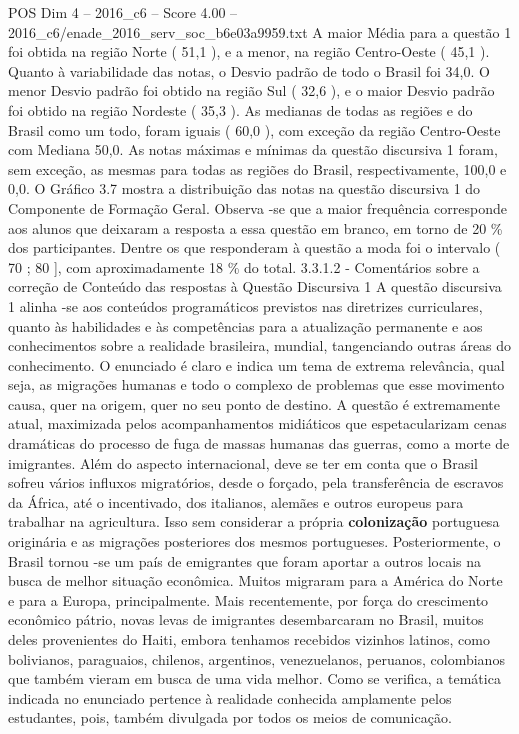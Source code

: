\begin{textsample}{POS Dim 4 – 2016\_c6 – Score 4.00 – 2016\_c6/enade\_2016\_serv\_soc\_b6e03a9959.txt}
A maior Média para a questão 1 foi obtida na região Norte ( 51,1 ), e a menor, na região Centro-Oeste ( 45,1 ).
Quanto à variabilidade das notas, o Desvio padrão de todo o Brasil foi 34,0.
O menor Desvio padrão foi obtido na região Sul ( 32,6 ), e o maior Desvio padrão foi obtido na região Nordeste ( 35,3 ).
As medianas de todas as regiões e do Brasil como um todo, foram iguais ( 60,0 ), com exceção da região Centro-Oeste com Mediana 50,0.
As notas máximas e mínimas da questão discursiva 1 foram, sem exceção, as mesmas para todas as regiões do Brasil, respectivamente, 100,0 e 0,0.
O Gráfico 3.7 mostra a distribuição das notas na questão discursiva 1 do Componente de Formação Geral.
Observa -se que a maior frequência corresponde aos alunos que deixaram a resposta a essa questão em branco, em torno de 20 \% dos participantes.
Dentre os que responderam à questão a moda foi o intervalo ( 70 ; 80 ], com aproximadamente 18 \% do total. 3.3.1.2 - Comentários sobre a correção de Conteúdo das respostas à Questão Discursiva 1 A questão discursiva 1 alinha -se aos conteúdos programáticos previstos nas diretrizes curriculares, quanto às habilidades e às competências para a atualização permanente e aos conhecimentos sobre a realidade brasileira, mundial, tangenciando outras áreas do conhecimento.
O enunciado é claro e indica um tema de extrema relevância, qual seja, as migrações humanas e todo o complexo de problemas que esse movimento causa, quer na origem, quer no seu ponto de destino.
A questão é extremamente atual, maximizada pelos acompanhamentos midiáticos que espetacularizam cenas dramáticas do processo de fuga de massas humanas das guerras, como a morte de imigrantes.
Além do aspecto internacional, deve se ter em conta que o Brasil sofreu vários influxos migratórios, desde o forçado, pela transferência de escravos da África, até o incentivado, dos italianos, alemães e outros europeus para trabalhar na agricultura.
Isso sem considerar a própria \textbf{colonização} portuguesa originária e as migrações posteriores dos mesmos portugueses.
Posteriormente, o Brasil tornou -se um país de emigrantes que foram aportar a outros locais na busca de melhor situação econômica.
Muitos migraram para a América do Norte e para a Europa, principalmente.
Mais recentemente, por força do crescimento econômico pátrio, novas levas de imigrantes desembarcaram no Brasil, muitos deles provenientes do Haiti, embora tenhamos recebidos vizinhos latinos, como bolivianos, paraguaios, chilenos, argentinos, venezuelanos, peruanos, colombianos que também vieram em busca de uma vida melhor.
Como se verifica, a temática indicada no enunciado pertence à realidade conhecida amplamente pelos estudantes, pois, também divulgada por todos os meios de comunicação.

\end{textsample}

